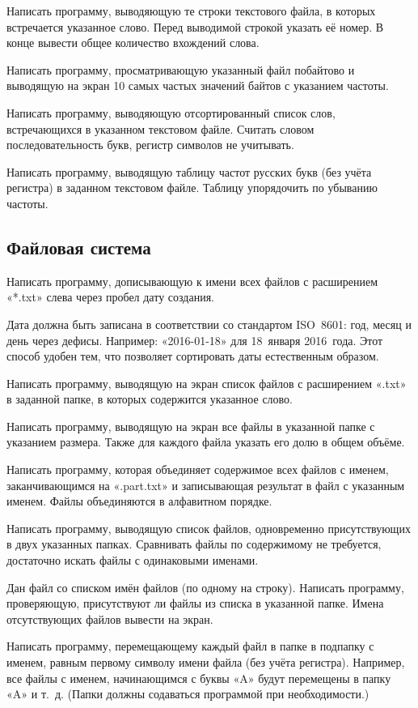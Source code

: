\task Написать программу, выводяющую те строки текстового файла, в
которых встречается указанное слово. Перед выводимой строкой указать
её номер. В конце вывести общее количество вхождений слова.

\task Написать программу, просматривающую указанный файл побайтово и
выводящую на экран 10 самых частых значений байтов с указанием
частоты.

\task Написать программу, выводяющую отсортированный список слов,
встречающихся в указанном текстовом файле. Считать словом
последовательность букв, регистр символов не учитывать.

\task Написать программу, выводящую таблицу частот русских букв (без
учёта регистра) в заданном текстовом файле. Таблицу упорядочить по
убыванию частоты.


\subsection{Файловая система}

\task Написать программу, дописывающую к имени всех файлов с
расширением «*.txt» слева через пробел дату создания.

Дата должна быть записана в соответствии со стандартом ISO~8601: год,
месяц и день через дефисы. Например: «2016-01-18» для 18~января
2016~года. Этот способ удобен тем, что позволяет сортировать даты
естественным образом.

\task Написать программу, выводящую на экран список файлов с
расширением «.txt» в заданной папке, в которых содержится указанное
слово.

\task Написать программу, выводящую на экран все файлы в указанной
папке с указанием размера. Также для каждого файла указать его долю в
общем объёме.

\task Написать программу, которая объединяет содержимое всех файлов с
именем, заканчивающимся на «.part.txt» и записывающая результат в файл
с указанным именем. Файлы объединяются в алфавитном порядке.

\task Написать программу, выводящую список файлов, одновременно
присутствующих в двух указанных папках. Сравнивать файлы по
содержимому не требуется, достаточно искать файлы с одинаковыми
именами.

\task Дан файл со списком имён файлов (по одному на строку). Написать
программу, проверяющую, присутствуют ли файлы из списка в указанной
папке. Имена отсутствующих файлов вывести на экран.

\task Написать программу, перемещающему каждый файл в папке в подпапку
с именем, равным первому символу имени файла (без учёта
регистра). Например, все файлы с именем, начинающимся с буквы «A»
будут перемещены в папку «A» и т.~д. (Папки должны содаваться
программой при необходимости.)

